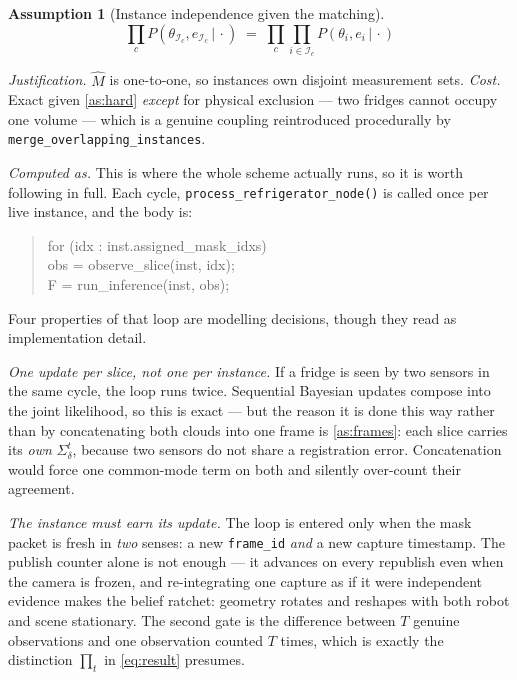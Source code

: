\documentclass[11pt,a4paper]{report}
\newcommand{\given}{\,|\,}
\theoremstyle{definition}   %
\newtheorem{assumption}{Assumption}
\begin{document}
\begin{assumption}[Instance independence given the matching]\label{as:inst}
\begin{equation}
\prod_{c}P(\theta_{\mathcal{I}_c},e_{\mathcal{I}_c}\given\cdot)
\;=\;\prod_{c}\prod_{i\in\mathcal{I}_c}P(\theta_i,e_i\given\cdot)
\end{equation}
\end{assumption}
\noindent\textit{Justification.} $\hat M$ is one-to-one, so instances own disjoint measurement
sets. \textit{Cost.} Exact given \ref{as:hard} \emph{except} for physical exclusion — two
fridges cannot occupy one volume — which is a genuine coupling reintroduced procedurally by
\texttt{merge\_overlapping\_instances}.


\smallskip\noindent\textit{Computed as.} This is where the whole scheme actually runs, so it is
worth following in full. Each cycle, \texttt{process\_refrigerator\_node()} is called once per
live instance, and the body is:

\begin{quote}
\ttfamily\small
for (idx : inst.assigned\_mask\_idxs)\\
\hspace*{2em}obs = observe\_slice(inst, idx);\\
\hspace*{2em}F = run\_inference(inst, obs);
\end{quote}

\noindent
Four properties of that loop are modelling decisions, though they read as implementation
detail.

\emph{One update per slice, not one per instance.} If a fridge is seen by two sensors in the same
cycle, the loop runs twice. Sequential Bayesian updates compose into the joint likelihood, so this
is exact --- but the reason it is done this way rather than by concatenating both clouds into one
frame is \ref{as:frames}: each slice carries its \emph{own} $\Sigma_\delta^t$, because two sensors
do not share a registration error. Concatenation would force one common-mode term on both and
silently over-count their agreement.

\emph{The instance must earn its update.} The loop is entered only when the mask packet is fresh
in \emph{two} senses: a new \texttt{frame\_id} \emph{and} a new capture timestamp. The publish
counter alone is not enough --- it advances on every republish even when the camera is frozen, and
re-integrating one capture as if it were independent evidence makes the belief ratchet: geometry
rotates and reshapes with both robot and scene stationary. The second gate is the difference
between $T$ genuine observations and one observation counted $T$ times, which is exactly the
distinction $\prod_t$ in \eqref{eq:result} presumes.
\end{document}
